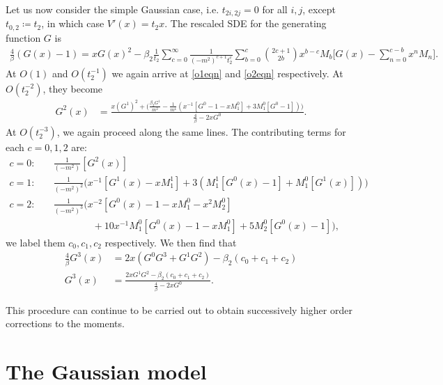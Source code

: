 \documentclass[10pt]{article}
\theoremstyle{plain}
\theoremstyle{definition}
\theoremstyle{plain}
\begin{document}
Let us now consider the simple Gaussian case, i.e. $t_{2i,2j}=0$ for all $i,j$, except $t_{0,2}\coloneqq t_2$, in which case $V'(x)=t_2 x$. The rescaled SDE for the generating function $G$ is
\begin{align*}
	\frac{4}{\beta}(G(x)-1) = xG(x)^2 - \beta_2\frac{1}{t_2}\sum_{c=0}^\infty \frac{1}{(-m^2)^{c+1}t_2^c}\sum_{b=0}^c {2c+1\choose 2b} x^{b-c} M_b \bigg[ G(x)-\sum_{n=0}^{c-b}x^n M_n \bigg].
\end{align*}
At $O(1)$ and $O(t_2^{-1})$ we again arrive at \ref{o1eqn} and \ref{o2eqn} respectively. At $O(t_2^{-2})$, they become
\begin{align*}
	G^2(x) &= \frac{x(G^1)^2 + \bigg(\frac{\beta_2G^1}{m^2} - \frac{1}{m^4}(x^{-1}[G^0-1-xM_1^0] + 3M_1^0[G^0-1]) \bigg)}{\frac{4}{\beta}-2xG^0}.
\end{align*}
At $O(t_2^{-3})$, we again proceed along the same lines. The contributing terms for each $c=0,1,2$ are:
\begin{align*}
	c = 0 :\quad& \frac{1}{(-m^2)}[G^2(x)]\\ 
	c = 1 :\quad& \frac{1}{(-m^2)^2} \bigg( x^{-1}[G^1(x)-xM_1^1] + 3(M_1^1[G^0(x)-1]+M_1^0[G^1(x)])\bigg)\\
	c = 2 :\quad& \frac{1}{(-m^2)^3} \bigg( x^{-2}[G^0(x)-1-xM_1^0-x^2M_2^0]\\ &\qquad\qquad+10x^{-1}M_1^0[G^0(x)-1-xM_1^0]+5M_2^0[G^0(x)-1] \bigg),
\end{align*}
we label them $c_0,c_1,c_2$ respectively. We then find that
\begin{align*}
	\frac{4}{\beta}G^3(x) &= 2x(G^0G^3 + G^1G^2) - \beta_2(c_0 + c_1 + c_2) \\
	G^3(x) &= \frac{2xG^1G^2 - \beta_2(c_0+c_1+c_2)}{\frac{4}{\beta}-2xG^0}.
\end{align*}

This procedure can continue to be carried out to obtain successively higher order corrections to the moments. 

\section{The Gaussian model}\label{sec: Gaussian}
\end{document}
